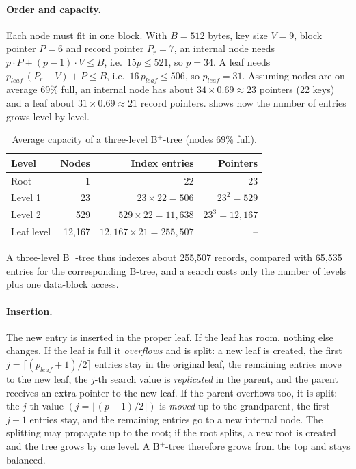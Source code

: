 \paragraph{Order and capacity.}
Each node must fit in one block. With $B = 512$ bytes, key size $V = 9$, block pointer $P = 6$ and
record pointer $P_r = 7$, an internal node needs $p\cdot P + (p-1)\cdot V \le B$, i.e.\
$15p \le 521$, so $p = 34$. A leaf needs $p_{leaf}\,(P_r + V) + P \le B$, i.e.\ $16\,p_{leaf} \le 506$,
so $p_{leaf} = 31$. Assuming nodes are on average 69\% full, an internal node has about
$34 \times 0.69 \approx 23$ pointers (22 keys) and a leaf about $31 \times 0.69 \approx 21$ record
pointers. \Cref{tab:capacity} shows how the number of entries grows level by level.

\begin{table}[H]
\centering
\small
\begin{tabular}{@{}lrrr@{}}
\toprule
\textbf{Level} & \textbf{Nodes} & \textbf{Index entries} & \textbf{Pointers} \\
\midrule
Root & 1 & 22 & 23 \\
Level 1 & 23 & $23\times 22 = 506$ & $23^2 = 529$ \\
Level 2 & 529 & $529\times 22 = 11{,}638$ & $23^3 = 12{,}167$ \\
Leaf level & 12,167 & $12{,}167\times 21 = 255{,}507$ & -- \\
\bottomrule
\end{tabular}
\caption{Average capacity of a three-level B$^+$-tree (nodes 69\% full).}
\label{tab:capacity}
\end{table}

A three-level B$^+$-tree thus indexes about 255{,}507 records, compared with 65{,}535 entries for
the corresponding B-tree, and a search costs only the number of levels plus one data-block access.

\paragraph{Insertion.}
The new entry is inserted in the proper leaf. If the leaf has room, nothing else changes. If the
leaf is full it \emph{overflows} and is split: a new leaf is created, the first
$j = \lceil (p_{leaf}+1)/2 \rceil$ entries stay in the original leaf, the remaining entries move to
the new leaf, the $j$-th search value is \emph{replicated} in the parent, and the parent receives an
extra pointer to the new leaf. If the parent overflows too, it is split: the $j$-th value
$(j = \lfloor (p+1)/2 \rfloor)$ is \emph{moved} up to the grandparent, the first $j-1$ entries stay,
and the remaining entries go to a new internal node. The splitting may propagate up to the root; if
the root splits, a new root is created and the tree grows by one level. A B$^+$-tree therefore grows
from the top and stays balanced.

